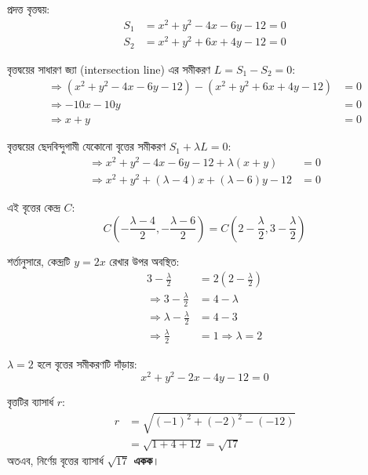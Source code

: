 \documentclass[12pt, a4paper]{article}
\begin{document}
\begin{tcolorbox}[solutionbox={সমাধান (Solution)}]
    \noindent
    প্রদত্ত বৃত্তদ্বয়:
    \begin{align*}
        S_1 &= x^2 + y^2 - 4x - 6y - 12 = 0 \\
        S_2 &= x^2 + y^2 + 6x + 4y - 12 = 0
    \end{align*}
    
    বৃত্তদ্বয়ের সাধারণ জ্যা (intersection line) এর সমীকরণ $L = S_1 - S_2 = 0$:
    \begin{align*}
        \Rightarrow (x^2 + y^2 - 4x - 6y - 12) - (x^2 + y^2 + 6x + 4y - 12) &= 0 \\
        \Rightarrow -10x - 10y &= 0 \\
        \Rightarrow x + y &= 0
    \end{align*}
    
    বৃত্তদ্বয়ের ছেদবিন্দুগামী যেকোনো বৃত্তের সমীকরণ $S_1 + \lambda L = 0$:
    \begin{align*}
        \Rightarrow x^2 + y^2 - 4x - 6y - 12 + \lambda(x + y) &= 0 \\
        \Rightarrow x^2 + y^2 + (\lambda - 4)x + (\lambda - 6)y - 12 &= 0
    \end{align*}
    
    এই বৃত্তের কেন্দ্র $C$:
    \[ C\left(-\frac{\lambda - 4}{2}, -\frac{\lambda - 6}{2}\right) = C\left(2 - \frac{\lambda}{2}, 3 - \frac{\lambda}{2}\right) \]
    
    শর্তানুসারে, কেন্দ্রটি $y = 2x$ রেখার উপর অবস্থিত:
    \begin{align*}
        3 - \frac{\lambda}{2} &= 2\left(2 - \frac{\lambda}{2}\right) \\
        \Rightarrow 3 - \frac{\lambda}{2} &= 4 - \lambda \\
        \Rightarrow \lambda - \frac{\lambda}{2} &= 4 - 3 \\
        \Rightarrow \frac{\lambda}{2} &= 1 \Rightarrow \lambda = 2
    \end{align*}
    
    $\lambda = 2$ হলে বৃত্তের সমীকরণটি দাঁড়ায়:
    \[ x^2 + y^2 - 2x - 4y - 12 = 0 \]
    
    বৃত্তটির ব্যাসার্ধ $r$:
    \begin{align*}
        r &= \sqrt{(-1)^2 + (-2)^2 - (-12)} \\
          &= \sqrt{1 + 4 + 12} = \sqrt{17}
    \end{align*}
    অতএব, নির্ণেয় বৃত্তের ব্যাসার্ধ \textbf{$\sqrt{17}$ একক}।
\end{tcolorbox}
\end{document}
